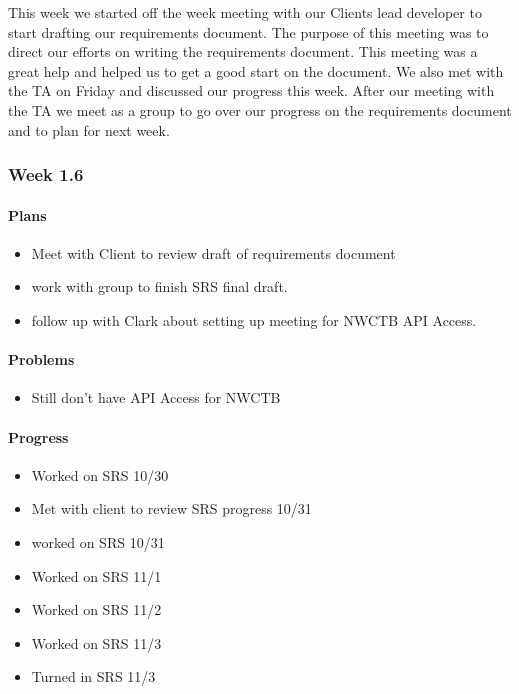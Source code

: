 \documentclass[onecolumn, draftclsnofoot,10pt, compsoc]{article}
\begin{document}
		        This week we started off the week meeting with our Clients lead developer to start drafting our requirements document. The purpose of this meeting was to direct our efforts on writing the requirements document. This meeting was a great help and helped us to get a good start on the document.  We also met with the TA on Friday and discussed our progress this week. After our meeting with the TA we meet as a group to go over our progress on the requirements document and to plan for next week.\\
		
		\subsubsection{Week 1.6}
		
		    \paragraph{Plans} \hfill \break
		        
		        \begin{itemize}
		            \item Meet with Client to review draft of requirements document
		            \item work with group to finish SRS final draft.
		            \item follow up with Clark about setting up meeting for NWCTB API Access.
		        \end{itemize}
		
		    \paragraph{Problems} \hfill \break
		        
		        \begin{itemize}
		            \item Still don't have API Access for NWCTB
		        \end{itemize}
		        
		    \paragraph{Progress} \hfill \break
		    
		        \begin{itemize}
		            \item Worked on SRS 10/30
		            \item Met with client to review SRS progress 10/31
		            \item worked on SRS 10/31
		            \item Worked on SRS 11/1
		            \item Worked on SRS 11/2
		            \item Worked on SRS 11/3
		            \item Turned in SRS 11/3
		        \end{itemize}
		
\end{document}

